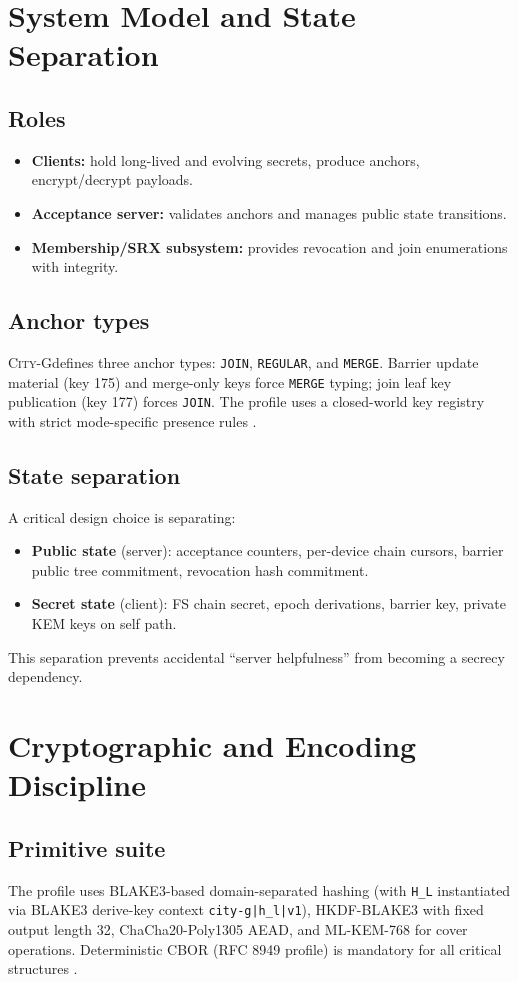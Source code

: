 \documentclass[11pt]{article}
\newcommand{\cityg}{\textsc{City-G}}
\begin{document}
\section{System Model and State Separation}
\subsection{Roles}
\begin{itemize}
  \item \textbf{Clients:} hold long-lived and evolving secrets, produce anchors, encrypt/decrypt payloads.
  \item \textbf{Acceptance server:} validates anchors and manages public state transitions.
  \item \textbf{Membership/SRX subsystem:} provides revocation and join enumerations with integrity.
\end{itemize}

\subsection{Anchor types}
\cityg defines three anchor types: \texttt{JOIN}, \texttt{REGULAR}, and \texttt{MERGE}. Barrier update material (key 175) and merge-only keys force \texttt{MERGE} typing; join leaf key publication (key 177) forces \texttt{JOIN}. The profile uses a closed-world key registry with strict mode-specific presence rules \citep{citygSpec2026}.

\subsection{State separation}
A critical design choice is separating:
\begin{itemize}
  \item \textbf{Public state} (server): acceptance counters, per-device chain cursors, barrier public tree commitment, revocation hash commitment.
  \item \textbf{Secret state} (client): FS chain secret, epoch derivations, barrier key, private KEM keys on self path.
\end{itemize}
This separation prevents accidental ``server helpfulness'' from becoming a secrecy dependency.

\section{Cryptographic and Encoding Discipline}
\subsection{Primitive suite}
The profile uses BLAKE3-based domain-separated hashing (with \texttt{H\_L} instantiated via BLAKE3 derive-key context \texttt{city-g|h\_l|v1}), HKDF-BLAKE3 with fixed output length 32, ChaCha20-Poly1305 AEAD, and ML-KEM-768 for cover operations. Deterministic CBOR (RFC 8949 profile) is mandatory for all critical structures \citep{blake3,rfc8949,rfc8439,fips203}.
\end{document}
